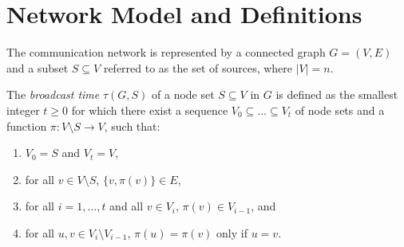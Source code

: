 \section{Network Model and Definitions} \label{sec:def}

The communication network is represented by a connected graph $G=(V,E)$ and a subset $S\subseteq V$ referred to as the set of sources, where $|V|=n$. 

\begin{definition} \label{def:broadcasttime}
The \emph{broadcast time} $\tau(G,S)$ of a node set $S\subseteq V$ in $G$ is defined as the smallest integer $t\geq 0$ for which there exist
a sequence $V_0\subseteq\dots\subseteq V_t$ of node sets and a function $\pi:V\setminus S\to V$, such that:
\begin{enumerate}
  \item $V_0=S$ and $V_t=V$, \label{def:boundary}
  \item for all $v\in V\setminus S$, $\{v,\pi(v)\}\in E$, \label{def:edge}
  \item for all $i=1,\ldots,t$ and all $v\in V_i$, $\pi(v)\in V_{i-1}$, and \label{def:parent}
  \item for all $u,v\in V_i\setminus V_{i-1}$, $\pi(u)=\pi(v)$ only if $u=v$. \label{def:unique}
\end{enumerate}
\end{definition}

